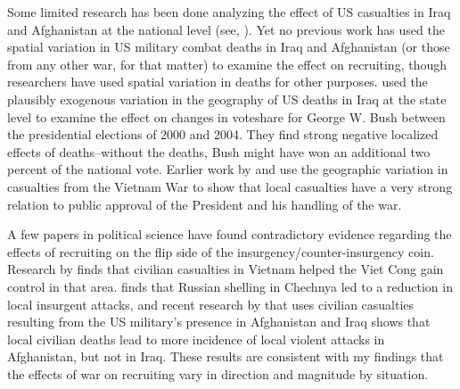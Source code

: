 \documentclass[12pt] {article}
\begin{document}
Some limited research has been done analyzing the effect of US casualties
in Iraq and Afghanistan at the national level (see\cite{BigRandDocument}, \cite{Simon-Warner-DEATHS!}).
Yet no previous work has used the spatial variation in US military combat deaths in Iraq and Afghanistan (or those from any other war, for that matter) to examine the effect
on recruiting, though researchers have used spatial variation
in deaths for other purposes. \cite{Ted-Miguel-Bush-Deaths}
used the plausibly exogenous variation in the geography of US deaths in Iraq at the state level to examine the effect on changes in voteshare for George W. Bush between
the presidential elections of 2000 and 2004. They find strong negative
localized effects of deaths--without the deaths, Bush might have won
an additional two percent of the national vote. Earlier work by \cite{SSGartner-WarCasualtiesPublicOpinion}
and \cite{SSGartnerAllPoliticsLocal} use the geographic variation
in casualties from the Vietnam War to show that local casualties have
a very strong relation to public approval of the President and his
handling of the war. %

A few papers in political science have found contradictory evidence regarding the effects of recruiting on the flip side of the insurgency/counter-insurgency coin. Research by \cite {Kocher-Vietnam} finds that civilian casualties in Vietnam helped the Viet Cong gain control in that area. \cite {Lyall} finds that Russian shelling in Chechnya led to a reduction in local insurgent attacks, and recent research by \cite{AfghanIraqCasualties} that uses civilian casualties resulting from the US military's presence in Afghanistan and Iraq shows that local civilian deaths lead to more incidence
of local violent attacks in Afghanistan, but not in Iraq. These results are consistent with my findings that the effects of war on recruiting vary in direction and magnitude by situation. 
\end{document}
